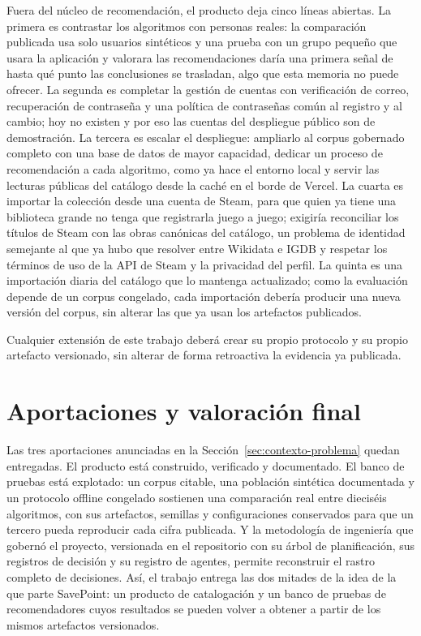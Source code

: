 Fuera del núcleo de recomendación, el producto deja cinco líneas abiertas. La primera es contrastar los algoritmos
con personas reales: la comparación publicada usa solo usuarios sintéticos y una prueba con un grupo pequeño que
usara la aplicación y valorara las recomendaciones daría una primera señal de hasta qué punto las conclusiones se
trasladan, algo que esta memoria no puede ofrecer. La segunda es completar la gestión de cuentas con verificación
de correo, recuperación de contraseña y una política de contraseñas común al registro y al cambio; hoy no existen
y por eso las cuentas del despliegue público son de demostración. La tercera es escalar el despliegue: ampliarlo al
corpus gobernado completo con una base de datos de mayor capacidad, dedicar un proceso de recomendación a cada
algoritmo, como ya hace el entorno local y servir las lecturas públicas del catálogo desde la caché en el borde de
Vercel. La cuarta es importar la colección desde una cuenta de Steam, para que quien ya tiene una biblioteca grande
no tenga que registrarla juego a juego; exigiría reconciliar los títulos de Steam con las obras canónicas del
catálogo, un problema de identidad semejante al que ya hubo que resolver entre Wikidata e IGDB y respetar los
términos de uso de la API de Steam y la privacidad del perfil. La quinta es una importación diaria del catálogo que
lo mantenga actualizado; como la evaluación depende de un corpus congelado, cada importación debería producir una
nueva versión del corpus, sin alterar las que ya usan los artefactos publicados.

Cualquier extensión de este trabajo deberá crear su propio protocolo y su propio artefacto
versionado, sin alterar de forma retroactiva la evidencia ya publicada.

\section{Aportaciones y valoración final}\label{sec:conc-aportaciones}\label{sec:conc-cierre}

Las tres aportaciones anunciadas en la Sección~\ref{sec:contexto-problema} quedan entregadas.
El producto está construido, verificado y documentado. El banco de pruebas está explotado: un
corpus citable, una población sintética documentada y un protocolo offline congelado sostienen
una comparación real entre dieciséis algoritmos, con sus artefactos, semillas y
configuraciones conservados para que un tercero pueda reproducir cada cifra publicada. Y la
metodología de ingeniería que gobernó el proyecto, versionada en el repositorio con su árbol
de planificación, sus registros de decisión y su registro de agentes, permite reconstruir el
rastro completo de decisiones. Así, el trabajo entrega las dos mitades de la idea de la que
parte SavePoint: un producto de catalogación y un banco de pruebas de recomendadores cuyos
resultados se pueden volver a obtener a partir de los mismos artefactos versionados.

